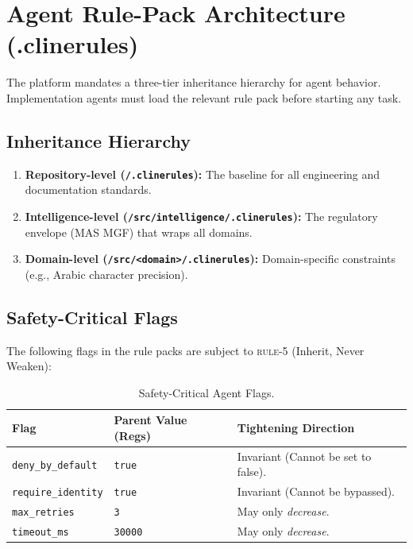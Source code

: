\documentclass[11pt,a4paper,twoside]{report}
\begin{document}
\section{Agent Rule-Pack Architecture (.clinerules)}
\label{sec:agent-rule-packs}

The platform mandates a three-tier inheritance hierarchy for agent behavior. Implementation agents must load the relevant rule pack before starting any task.

\subsection{Inheritance Hierarchy}
\begin{enumerate}
\item \textbf{Repository-level (\texttt{/.clinerules}):} The baseline for all engineering and documentation standards.
\item \textbf{Intelligence-level (\texttt{/src/intelligence/.clinerules}):} The regulatory envelope (MAS MGF) that wraps all domains.
\item \textbf{Domain-level (\texttt{/src/<domain>/.clinerules}):} Domain-specific constraints (e.g., Arabic character precision).
\end{enumerate}

\subsection{Safety-Critical Flags}
The following flags in the rule packs are subject to \textsc{rule-5} (Inherit, Never Weaken):
\begin{table}[htbp]
\centering
\footnotesize
\caption{Safety-Critical Agent Flags.}
\label{tab:safety-flags}
\begin{tabularx}{\textwidth}{@{}l X X@{}}
\toprule
\textbf{Flag} & \textbf{Parent Value (Regs)} & \textbf{Tightening Direction} \\
\midrule
\texttt{deny\_by\_default} & \texttt{true} & Invariant (Cannot be set to false). \\
\texttt{require\_identity} & \texttt{true} & Invariant (Cannot be bypassed). \\
\texttt{max\_retries} & \texttt{3} & May only \emph{decrease}. \\
\texttt{timeout\_ms} & \texttt{30000} & May only \emph{decrease}. \\
\bottomrule
\end{tabularx}
\end{table}
\end{document}
